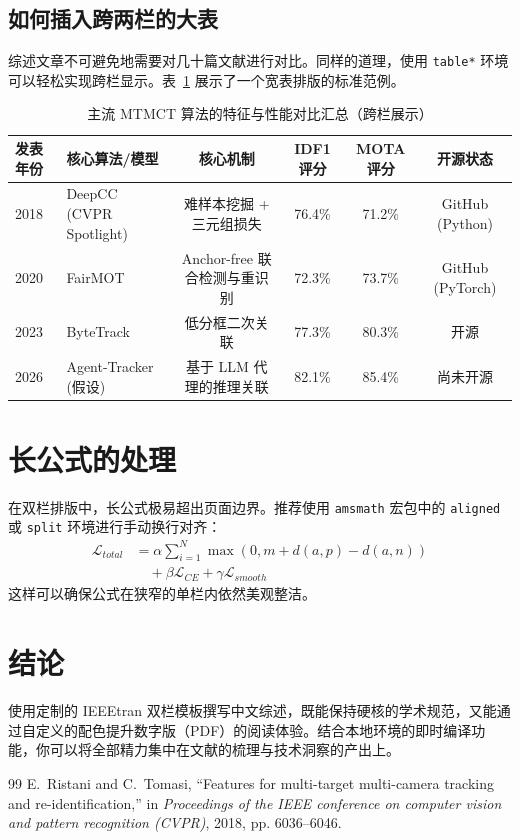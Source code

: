 \documentclass[journal,10pt]{IEEEtran} %
\begin{document}
\subsection{如何插入跨两栏的大表}
综述文章不可避免地需要对几十篇文献进行对比。同样的道理，使用 \verb|table*| 环境可以轻松实现跨栏显示。表~\ref{tab:comparison} 展示了一个宽表排版的标准范例。

\begin{table}[t] %
\centering
\caption{主流 MTMCT 算法的特征与性能对比汇总（跨栏展示）}
\label{tab:comparison}
\vspace{0.5em}
\begin{tabular}{@{}llcccc@{}}
\toprule
\textbf{发表年份} & \textbf{核心算法/模型} & \textbf{核心机制} & \textbf{IDF1 评分} & \textbf{MOTA 评分} & \textbf{开源状态} \\ \midrule
2018 & DeepCC (CVPR Spotlight) & 难样本挖掘 + 三元组损失 & 76.4\% & 71.2\% & GitHub (Python) \\
2020 & FairMOT & Anchor-free 联合检测与重识别 & 72.3\% & 73.7\% & GitHub (PyTorch) \\
2023 & ByteTrack & 低分框二次关联 & 77.3\% & 80.3\% & 开源 \\
2026 & Agent-Tracker (假设) & 基于 LLM 代理的推理关联 & 82.1\% & 85.4\% & 尚未开源 \\ \bottomrule
\end{tabular}
\end{table}

\section{长公式的处理}
在双栏排版中，长公式极易超出页面边界。推荐使用 \verb|amsmath| 宏包中的 \verb|aligned| 或 \verb|split| 环境进行手动换行对齐：
\begin{equation}
\begin{aligned}
    \mathcal{L}_{total} &= \alpha \sum_{i=1}^{N} \max(0, m + d(a, p) - d(a, n)) \\
    &\quad + \beta \mathcal{L}_{CE} + \gamma \mathcal{L}_{smooth}
\end{aligned}
\end{equation}
这样可以确保公式在狭窄的单栏内依然美观整洁。

\section{结论}
使用定制的 IEEEtran 双栏模板撰写中文综述，既能保持硬核的学术规范，又能通过自定义的配色提升数字版（PDF）的阅读体验。结合本地环境的即时编译功能，你可以将全部精力集中在文献的梳理与技术洞察的产出上。

\begin{thebibliography}{99}
E.~Ristani and C.~Tomasi, ``Features for multi-target multi-camera tracking and re-identification,'' in \emph{Proceedings of the IEEE conference on computer vision and pattern recognition (CVPR)}, 2018, pp. 6036--6046.
\end{thebibliography}
\end{document}
